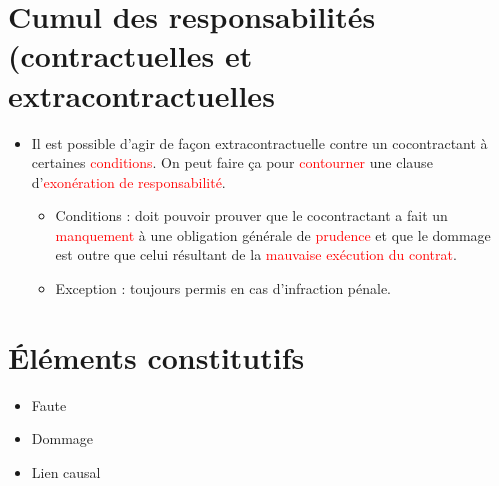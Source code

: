 \section{Cumul des responsabilités (contractuelles et extracontractuelles}
\begin{itemize}
	\item Il est possible d'agir de façon extracontractuelle contre un cocontractant à certaines \textcolor{red}{conditions}. On peut faire ça pour \textcolor{red}{contourner} une clause d'\textcolor{red}{exonération de responsabilité}.
	\begin{itemize}
		\item Conditions : doit pouvoir prouver que le cocontractant a fait un \textcolor{red}{manquement} à une obligation générale de \textcolor{red}{prudence} et que le dommage est outre que celui résultant de la \textcolor{red}{mauvaise exécution du contrat}.
		\item Exception : toujours permis en cas d'infraction pénale.
 	\end{itemize}
\end{itemize}

\section{Éléments constitutifs}
\begin{itemize}
	\item Faute
	\item Dommage
	\item Lien causal
\end{itemize}

